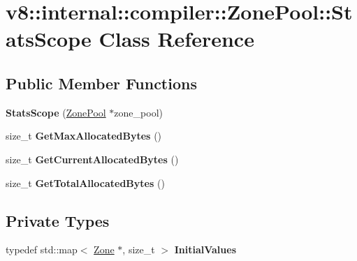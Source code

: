 \hypertarget{classv8_1_1internal_1_1compiler_1_1_zone_pool_1_1_stats_scope}{}\section{v8\+:\+:internal\+:\+:compiler\+:\+:Zone\+Pool\+:\+:Stats\+Scope Class Reference}
\label{classv8_1_1internal_1_1compiler_1_1_zone_pool_1_1_stats_scope}
\subsection*{Public Member Functions}
\begin{DoxyCompactItemize}
\item 
{\bfseries Stats\+Scope} (\hyperlink{classv8_1_1internal_1_1compiler_1_1_zone_pool}{Zone\+Pool} $\ast$zone\+\_\+pool)\hypertarget{classv8_1_1internal_1_1compiler_1_1_zone_pool_1_1_stats_scope_aa68e2b9b4a4d23fd85509ecb72e4ffc5}{}\label{classv8_1_1internal_1_1compiler_1_1_zone_pool_1_1_stats_scope_aa68e2b9b4a4d23fd85509ecb72e4ffc5}

\item 
size\+\_\+t {\bfseries Get\+Max\+Allocated\+Bytes} ()\hypertarget{classv8_1_1internal_1_1compiler_1_1_zone_pool_1_1_stats_scope_a6ae47d3a38fa795d57079b6dd3fdaa2d}{}\label{classv8_1_1internal_1_1compiler_1_1_zone_pool_1_1_stats_scope_a6ae47d3a38fa795d57079b6dd3fdaa2d}

\item 
size\+\_\+t {\bfseries Get\+Current\+Allocated\+Bytes} ()\hypertarget{classv8_1_1internal_1_1compiler_1_1_zone_pool_1_1_stats_scope_a5aee10b1cdb799fd42b1552ba9f33f91}{}\label{classv8_1_1internal_1_1compiler_1_1_zone_pool_1_1_stats_scope_a5aee10b1cdb799fd42b1552ba9f33f91}

\item 
size\+\_\+t {\bfseries Get\+Total\+Allocated\+Bytes} ()\hypertarget{classv8_1_1internal_1_1compiler_1_1_zone_pool_1_1_stats_scope_a879242c36b27ed264f454b17f70b0917}{}\label{classv8_1_1internal_1_1compiler_1_1_zone_pool_1_1_stats_scope_a879242c36b27ed264f454b17f70b0917}

\end{DoxyCompactItemize}
\subsection*{Private Types}
\begin{DoxyCompactItemize}
\item 
typedef std\+::map$<$ \hyperlink{classv8_1_1internal_1_1_zone}{Zone} $\ast$, size\+\_\+t $>$ {\bfseries Initial\+Values}\hypertarget{classv8_1_1internal_1_1compiler_1_1_zone_pool_1_1_stats_scope_ac4796d0bbae154397d35d0dd34e2d099}{}\label{classv8_1_1internal_1_1compiler_1_1_zone_pool_1_1_stats_scope_ac4796d0bbae154397d35d0dd34e2d099}

\end{DoxyCompactItemize}
